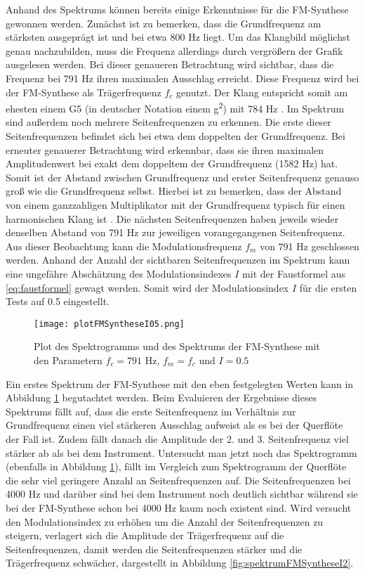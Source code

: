 Anhand des Spektrums können bereits einige Erkenntnisse für die FM-Synthese gewonnen werden. Zunächst ist zu bemerken, dass die Grundfrequenz am stärksten ausgeprägt ist und bei etwa 800 Hz liegt. Um das Klangbild möglichst genau nachzubilden, muss die Frequenz allerdings durch vergrößern der Grafik ausgelesen werden. Bei dieser genaueren Betrachtung wird sichtbar, dass die Frequenz bei 791 Hz ihren maximalen Ausschlag erreicht. Diese Frequenz wird bei der FM-Synthese als Trägerfrequenz $f_c$ genutzt. Der Klang entspricht somit am ehesten einem G5 (in deutscher Notation einem g\textsuperscript{2}) mit 784 Hz \cite[S. 181]{borucki}. Im Spektrum sind außerdem noch mehrere Seitenfrequenzen zu erkennen. Die erste dieser Seitenfrequenzen befindet sich bei etwa dem doppelten der Grundfrequenz. Bei erneuter genauerer Betrachtung wird erkennbar, dass sie ihren maximalen Amplitudenwert bei exakt dem doppeltem der Grundfrequenz (1582 Hz) hat. Somit ist der Abstand zwischen Grundfrequenz und erster Seitenfrequenz genauso groß wie die Grundfrequenz selbst. Hierbei ist zu bemerken, dass der Abstand von einem ganzzahligen Multiplikator mit der Grundfrequenz typisch für einen harmonischen Klang ist \cite[S. 528]{chowningPaper}. Die nächsten Seitenfrequenzen haben jeweils wieder denselben Abstand von 791 Hz zur jeweiligen vorangegangenen Seitenfrequenz. Aus dieser Beobachtung kann die Modulationsfrequenz $f_m$ von 791 Hz geschlossen werden. Anhand der Anzahl der sichtbaren Seitenfrequenzen im Spektrum kann eine ungefähre Abschätzung des Modulationsindexes $I$ mit der Faustformel aus \ref{eq:faustformel} gewagt werden. Somit wird der Modulationsindex $I$ für die ersten Tests auf 0.5 eingestellt. 

\begin{figure} [ht]
\centering
  \texttt{[image: plotFMSyntheseI05.png]}
\caption{Plot des Spektrogramms und des Spektrums der FM-Synthese mit den Parametern $f_c = 791$ Hz, $f_m = f_c$ und $I = 0.5$ }
\label{fig:plotFMSyntheseI05}
\end{figure}

Ein erstes Spektrum der FM-Synthese mit den eben festgelegten Werten kann in Abbildung \ref{fig:plotFMSyntheseI05} begutachtet werden. Beim Evaluieren der Ergebnisse dieses Spektrums fällt auf, dass die erste Seitenfrequenz im Verhältnis zur Grundfrequenz einen viel stärkeren Ausschlag aufweist als es bei der Querflöte der Fall ist. Zudem fällt danach die Amplitude der 2. und 3. Seitenfrequenz viel stärker ab als bei dem Instrument. Untersucht man jetzt noch das Spektrogramm (ebenfalls in Abbildung \ref{fig:plotFMSyntheseI05}), fällt im Vergleich zum Spektrogramm der Querflöte die sehr viel geringere Anzahl an Seitenfrequenzen auf. Die Seitenfrequenzen bei 4000 Hz und darüber sind bei dem Instrument noch deutlich sichtbar während sie bei der FM-Synthese schon bei 4000 Hz kaum noch existent sind. Wird versucht den Modulationsindex zu erhöhen um die Anzahl der Seitenfrequenzen zu steigern, verlagert sich die Amplitude der Trägerfrequenz auf die Seitenfrequenzen, damit werden die Seitenfrequenzen stärker und die Trägerfrequenz schwächer, dargestellt in Abbildung \ref{fig:spektrumFMSyntheseI2}. 


